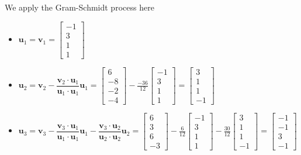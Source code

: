 \documentclass[a4paper,10pt]{article}
\begin{document}
\begin{solution}
We apply the Gram-Schmidt process here
\begin{itemize}
\item $\mathbf u_1=\mathbf v_1=\begin{bmatrix}
-1\\3\\1\\1
\end{bmatrix}$
\item $\mathbf u_2=\mathbf v_2-\dfrac{\mathbf v_2\cdot\mathbf u_1}{\mathbf u_1\cdot\mathbf u_1}\mathbf u_1=\begin{bmatrix}
6\\-8\\-2\\-4
\end{bmatrix}-\frac{-36}{12}\begin{bmatrix}
-1\\3\\1\\1
\end{bmatrix}=\begin{bmatrix}
3\\1\\1\\-1
\end{bmatrix}$
\item $\mathbf u_3=\mathbf v_3-\dfrac{\mathbf v_3\cdot\mathbf u_1}{\mathbf u_1\cdot\mathbf u_1}\mathbf u_1-\dfrac{\mathbf v_3\cdot\mathbf u_2}{\mathbf u_2\cdot\mathbf u_2}\mathbf u_2=\begin{bmatrix}
6\\3\\6\\-3
\end{bmatrix}-\frac{6}{12}\begin{bmatrix}
-1\\3\\1\\1
\end{bmatrix}-\frac{30}{12}\begin{bmatrix}
3\\1\\1\\-1
\end{bmatrix}=\begin{bmatrix}
-1\\-1\\3\\-1
\end{bmatrix}$
\end{itemize}

\end{solution}
\end{document}
